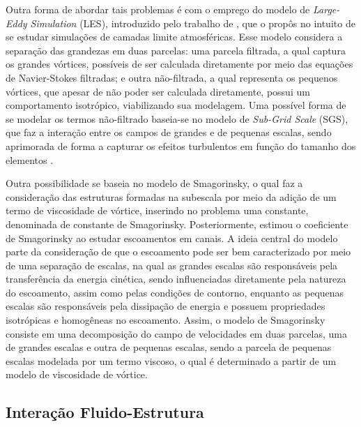 Outra forma de abordar tais problemas é com o emprego do modelo de \textit{Large-Eddy Simulation} (LES), introduzido pelo trabalho de , que o propôs no intuito de se estudar simulações de camadas limite atmosféricas. Esse modelo considera a separação das grandezas em duas parcelas: uma parcela filtrada, a qual captura os grandes vórtices, possíveis de ser calculada diretamente por meio das equações de Navier-Stokes filtradas; e outra não-filtrada, a qual representa os pequenos vórtices, que apesar de não poder ser calculada diretamente, possui um comportamento isotrópico, viabilizando sua modelagem. Uma possível forma de se modelar os termos não-filtrado baseia-se no modelo de \textit{Sub-Grid Scale} (SGS), que faz a interação entre os campos de grandes e de pequenas escalas, sendo aprimorada de forma a capturar os efeitos turbulentos em função do tamanho dos elementos \cite{ghosal1995basic,hughes2000large,moeng2015large}.

Outra possibilidade se baseia no modelo de Smagorinsky, o qual faz a consideração das estruturas formadas na subescala por meio da adição de um termo de viscosidade de vórtice, inserindo no problema uma constante, denominada de constante de Smagorinsky. Posteriormente,  estimou o coeficiente de Smagorinsky ao estudar escoamentos em canais. A ideia central do modelo parte da consideração de que o escoamento pode ser bem caracterizado por meio de uma separação de escalas, na qual as grandes escalas são responsáveis pela transferência da energia cinética, sendo influenciadas diretamente pela natureza do escoamento, assim como pelas condições de contorno, enquanto as pequenas escalas são responsáveis pela dissipação de energia e possuem propriedades isotrópicas e homogêneas no escoamento. Assim, o modelo de Smagorinsky consiste em uma decomposição do campo de velocidades em duas parcelas, uma de grandes escalas e outra de pequenas escalas, sendo a parcela de pequenas escalas modelada por um termo viscoso, o qual é determinado a partir de um modelo de viscosidade de vórtice.

\subsection{Interação Fluido-Estrutura} \label{IFE}


